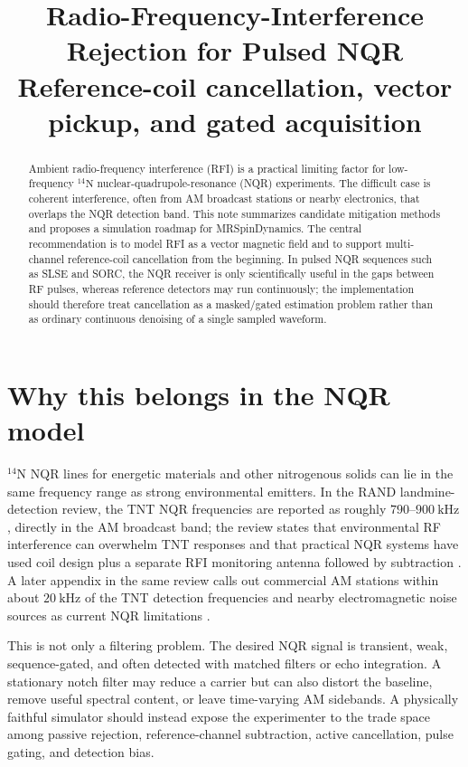 \documentclass[10pt]{article}
\title{\vspace{-1.3em}\textbf{Radio-Frequency-Interference Rejection for Pulsed NQR}\\[-1mm]
\large Reference-coil cancellation, vector pickup, and gated acquisition}
\author{}
\date{}
\begin{document}
\maketitle
\vspace{-2.1em}

\begin{abstract}
\noindent
Ambient radio-frequency interference (RFI) is a practical limiting factor for
low-frequency \({}^{14}\mathrm N\) nuclear-quadrupole-resonance (NQR)
experiments.  The difficult case is coherent interference, often from AM
broadcast stations or nearby electronics, that overlaps the NQR detection band.
This note summarizes candidate mitigation methods and proposes a simulation
roadmap for MRSpinDynamics.  The central recommendation is to model RFI as a
vector magnetic field and to support multi-channel reference-coil cancellation
from the beginning.  In pulsed NQR sequences such as SLSE and SORC, the NQR
receiver is only scientifically useful in the gaps between RF pulses, whereas
reference detectors may run continuously; the implementation should therefore
treat cancellation as a masked/gated estimation problem rather than as ordinary
continuous denoising of a single sampled waveform.
\end{abstract}

\section{Why this belongs in the NQR model}

\({}^{14}\mathrm N\) NQR lines for energetic materials and other nitrogenous
solids can lie in the same frequency range as strong environmental emitters.
In the RAND landmine-detection review, the TNT NQR frequencies are reported as
roughly \(790\)--\(900~\mathrm{kHz}\), directly in the AM broadcast band; the
review states that environmental RF interference can overwhelm TNT responses
and that practical NQR systems have used coil design plus a separate RFI
monitoring antenna followed by subtraction \cite{rand2003}.  A later appendix
in the same review calls out commercial AM stations within about
\(20~\mathrm{kHz}\) of the TNT detection frequencies and nearby electromagnetic
noise sources as current NQR limitations \cite{rand2003}.

This is not only a filtering problem.  The desired NQR signal is transient,
weak, sequence-gated, and often detected with matched filters or echo
integration.  A stationary notch filter may reduce a carrier but can also
distort the baseline, remove useful spectral content, or leave time-varying AM
sidebands.  A physically faithful simulator should instead expose the
experimenter to the trade space among passive rejection, reference-channel
subtraction, active cancellation, pulse gating, and detection bias.
\end{document}
